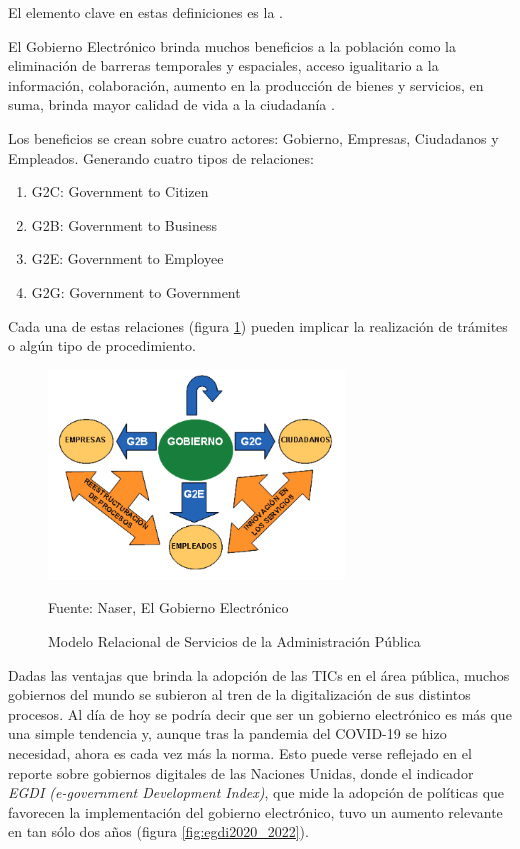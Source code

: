 El elemento clave en estas definiciones es la \cite{naserGobiernoElectronicoGestion2011}.


El Gobierno Electrónico brinda muchos beneficios a la población como 
la eliminación de barreras temporales y espaciales, 
acceso igualitario a la información, colaboración, aumento en la producción de bienes y servicios, 
en suma, brinda mayor calidad de vida a la ciudadanía \cite[16]{naserGobiernoElectronicoGestion2011}.

Los beneficios se crean sobre cuatro actores: Gobierno, Empresas, Ciudadanos y Empleados. Generando cuatro tipos de relaciones:

\begin{enumerate}
    \item G2C: Government to Citizen
    \item G2B: Government to Business
    \item G2E: Government to Employee
    \item G2G: Government to Government
\end{enumerate}

Cada una de estas relaciones (figura \ref{fig:g2all}) pueden implicar la realización de trámites o algún tipo de procedimiento.

\begin{figure}[!htpb]
    \centering
    \includegraphics[width=0.7\textwidth]{assets/g2all}
    \caption{Modelo Relacional de Servicios de la Administración Pública}{Fuente: Naser, El Gobierno Electrónico}
    \label{fig:g2all}
\end{figure}

Dadas las ventajas que brinda la adopción de las TICs en el área pública, muchos gobiernos del mundo se subieron al tren de la digitalización de sus distintos procesos. 
Al día de hoy se podría decir que ser un gobierno electrónico es más que una simple tendencia y, aunque tras la pandemia del COVID-19 se hizo necesidad, ahora es cada vez más la norma. 
Esto puede verse reflejado en el reporte sobre gobiernos digitales de las Naciones Unidas, 
donde el indicador \textit{EGDI (e-government Development Index)}, que mide la adopción de políticas que favorecen la implementación del gobierno electrónico, 
tuvo un aumento relevante en tan sólo dos años (figura \ref{fig:egdi2020_2022}).

